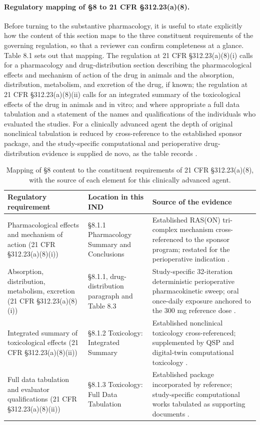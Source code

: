 \paragraph{Regulatory mapping of \S 8 to 21 CFR \S 312.23(a)(8).}
Before turning to the substantive pharmacology, it is useful to state explicitly
how the content of this section maps to the three constituent requirements of the
governing regulation, so that a reviewer can confirm completeness at a glance.
Table 8.1 sets out that mapping. The regulation at 21 CFR \S 312.23(a)(8)(i)
calls for a pharmacology and drug-distribution section describing the
pharmacological effects and mechanism of action of the drug in animals and the
absorption, distribution, metabolism, and excretion of the drug, if known; the
regulation at 21 CFR \S 312.23(a)(8)(ii) calls for an integrated summary of the
toxicological effects of the drug in animals and in vitro; and where appropriate
a full data tabulation and a statement of the names and qualifications of the
individuals who evaluated the studies. For a clinically advanced agent the depth
of original nonclinical tabulation is reduced by cross-reference to the
established sponsor package, and the study-specific computational and
perioperative drug-distribution evidence is supplied de novo, as the table
records \cite{phase1guidance,daraxwhipple}.

\begin{table}[t]
\centering
\caption{Mapping of \S 8 content to the constituent requirements of 21 CFR
\S 312.23(a)(8), with the source of each element for this clinically advanced
agent.}
\label{tab:sec07-map}
\begin{tabularx}{\textwidth}{L{3.5cm} L{3.7cm} Y}
\toprule
\textbf{Regulatory requirement} & \textbf{Location in this IND} & \textbf{Source of the evidence} \\
\midrule
Pharmacological effects and mechanism of action (21 CFR \S 312.23(a)(8)(i)) & \S 8.1.1 Pharmacology Summary and Conclusions & Established RAS(ON) tri-complex mechanism cross-referenced to the sponsor program; restated for the perioperative indication \cite{daraxwhipple}. \\
Absorption, distribution, metabolism, excretion (21 CFR \S 312.23(a)(8)(i)) & \S 8.1.1, drug-distribution paragraph and Table 8.3 & Study-specific 32-iteration deterministic perioperative pharmacokinetic sweep; oral once-daily exposure anchored to the 300 mg reference dose \cite{onpremwhippl}. \\
Integrated summary of toxicological effects (21 CFR \S 312.23(a)(8)(ii)) & \S 8.1.2 Toxicology: Integrated Summary & Established nonclinical toxicology cross-referenced; supplemented by QSP and digital-twin computational toxicology \cite{qspmetpancre,fdadigtwinpc}. \\
Full data tabulation and evaluator qualifications (21 CFR \S 312.23(a)(8)(ii)) & \S 8.1.3 Toxicology: Full Data Tabulation & Established package incorporated by reference; study-specific computational works tabulated as supporting documents \cite{phase1guidance,daraxwhipple}. \\
\bottomrule
\end{tabularx}
\end{table}

